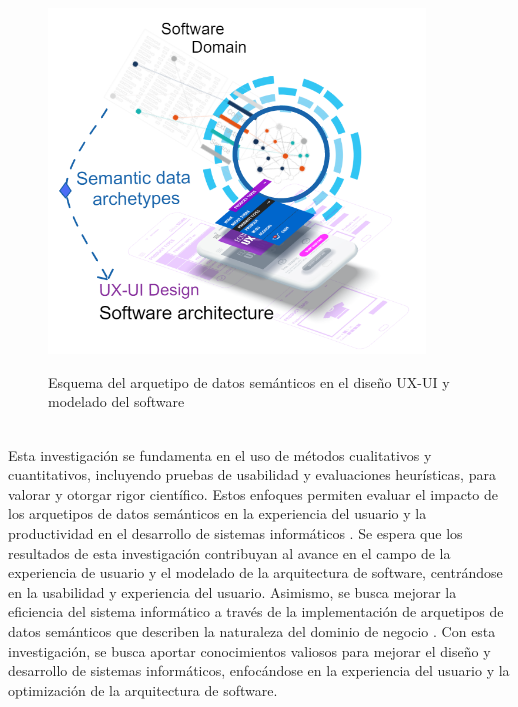\documentclass[12pt,a4paper]{article}
\begin{document}
\begin{figure}[htb]
  \centering
  {\includegraphics[clip=true,trim= 0cm 0cm 0cm 0cm, width=10cm]{Figuras/figDescripcion.png}}
  \caption{Esquema del arquetipo de datos semánticos en el diseño UX-UI y modelado del software}
  \label{fig:figDescripcion}
\end{figure}
\\
Esta investigación se fundamenta en el uso de métodos cualitativos y cuantitativos, incluyendo pruebas de usabilidad y evaluaciones heurísticas, para valorar y otorgar rigor científico. Estos enfoques permiten evaluar el impacto de los arquetipos de datos semánticos en la experiencia del usuario y la productividad en el desarrollo de sistemas informáticos
\cite{Govinda2015}
\cite{Marco-Ruiz2015}
. Se espera que los resultados de esta investigación contribuyan al avance en el campo de la experiencia de usuario y el modelado de la arquitectura de software, centrándose en la usabilidad y experiencia del usuario. Asimismo, se busca mejorar la eficiencia del sistema informático a través de la implementación de arquetipos de datos semánticos que describen la naturaleza del dominio de negocio
\cite{Duftschmid2010}
\cite{Safina2016}
\cite{Hassan2016813}
. Con esta investigación, se busca aportar conocimientos valiosos para mejorar el diseño y desarrollo de sistemas informáticos, enfocándose en la experiencia del usuario y la optimización de la arquitectura de software.

\end{document}
